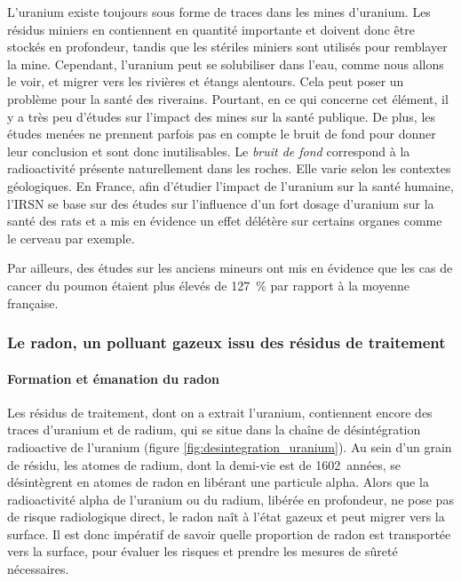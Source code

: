 \documentclass{article}
\begin{document}
L'uranium existe toujours sous forme de traces dans les mines d'uranium. Les résidus miniers en contiennent en quantité importante et doivent donc être stockés en profondeur, tandis que les stériles miniers sont utilisés pour remblayer la mine. Cependant, l'uranium peut se solubiliser dans l'eau, comme nous allons le voir, et migrer vers les rivières et étangs alentours. Cela peut poser un problème pour la santé des riverains. Pourtant, en ce qui concerne cet élément, il y a très peu d'études sur l’impact des mines sur la santé publique. De plus, les études menées ne prennent parfois pas en compte le bruit de fond pour donner leur conclusion et sont donc inutilisables. Le \emph{bruit de fond} correspond à la radioactivité présente naturellement dans les roches. Elle varie selon les contextes géologiques. En France, afin d’étudier l’impact de l’uranium sur la santé humaine, l’IRSN se base sur des études sur l’influence d’un fort dosage d’uranium sur la santé des rats et a mis en évidence un effet délétère sur certains organes comme le cerveau par exemple.

Par ailleurs, des études sur les anciens mineurs ont mis en évidence que les cas de cancer du poumon étaient plus élevés de 127~\% par rapport à la moyenne française.


\subsubsection{Le radon, un polluant gazeux issu des résidus de traitement}

\paragraph{Formation et émanation du radon} Les résidus de traitement, dont on a extrait l’uranium, contiennent encore des traces d’uranium et de radium, qui se situe dans la chaîne de désintégration radioactive de l’uranium (figure \ref{fig:desintegration_uranium}). Au sein d’un grain de résidu, les atomes de radium, dont la demi-vie est de 1602~années, se désintègrent en atomes de radon en libérant une particule alpha. Alors que la radioactivité alpha de l’uranium ou du radium, libérée en profondeur, ne pose pas de risque radiologique direct, le radon naît à l’état gazeux et peut migrer vers la surface. Il est donc impératif de savoir quelle proportion de radon est transportée vers la surface, pour évaluer les risques et prendre les mesures de sûreté nécessaires.
\end{document}
